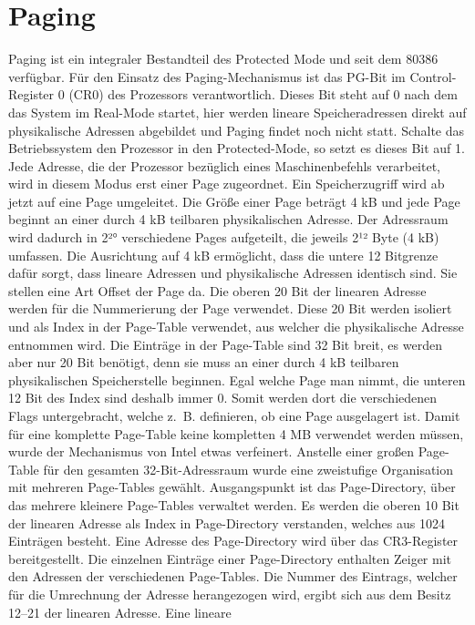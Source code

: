 \documentclass[12pt]{book}
\begin{document}
\section{Paging}
Paging ist ein integraler Bestandteil des Protected Mode und seit dem 80386
verfügbar. Für den Einsatz des Paging-Mechanismus ist das PG-Bit im
Control-Register 0 (CR0) des Prozessors verantwortlich. Dieses Bit steht auf 0
nach dem das System im Real-Mode startet, hier werden lineare Speicheradressen
direkt auf physikalische Adressen abgebildet und Paging findet noch nicht statt.
Schalte das Betriebssystem den Prozessor in den Protected-Mode, so setzt es
dieses Bit auf 1. Jede Adresse, die der Prozessor bezüglich eines
Maschinenbefehls verarbeitet, wird in diesem Modus erst einer Page zugeordnet.
Ein Speicherzugriff wird ab jetzt auf eine Page umgeleitet. Die Größe einer Page
beträgt 4 kB und jede Page beginnt an einer durch 4 kB teilbaren physikalischen
Adresse. Der Adressraum wird dadurch in 2²° verschiedene Pages aufgeteilt, die
jeweils 2¹² Byte (4 kB) umfassen. Die Ausrichtung auf 4 kB ermöglicht, dass die
untere 12 Bitgrenze dafür sorgt, dass lineare Adressen und physikalische
Adressen identisch sind. Sie stellen eine Art Offset der Page da. Die oberen 20
Bit der linearen Adresse werden für die Nummerierung der Page verwendet. Diese
20 Bit werden isoliert und als Index in der Page-Table verwendet, aus welcher
die physikalische Adresse entnommen wird. Die Einträge in der Page-Table sind 32
Bit breit, es werden aber nur 20 Bit benötigt, denn sie muss an einer durch 4 kB
teilbaren physikalischen Speicherstelle beginnen. Egal welche Page man nimmt,
die unteren 12 Bit des Index sind deshalb immer 0. Somit werden dort die
verschiedenen Flags untergebracht, welche z. B. definieren, ob eine Page
ausgelagert ist. Damit für eine komplette Page-Table keine kompletten 4 MB
verwendet werden müssen, wurde der Mechanismus von Intel etwas verfeinert.
Anstelle einer großen Page-Table für den gesamten 32-Bit-Adressraum wurde eine
zweistufige Organisation mit mehreren Page-Tables gewählt. Ausgangspunkt ist das
Page-Directory, über das mehrere kleinere Page-Tables verwaltet werden. Es
werden die oberen 10 Bit der linearen Adresse als Index in Page-Directory
verstanden, welches aus 1024 Einträgen besteht. Eine Adresse des Page-Directory
wird über das CR3-Register bereitgestellt. Die einzelnen Einträge einer
Page-Directory enthalten Zeiger mit den Adressen der verschiedenen Page-Tables.
Die Nummer des Eintrags, welcher für die Umrechnung der Adresse herangezogen
wird, ergibt sich aus dem Besitz 12–21 der linearen Adresse. Eine lineare
\end{document}
